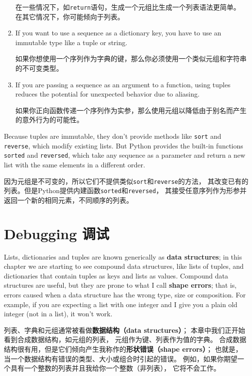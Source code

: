 \documentclass[10pt]{book}
\begin{document}
\begin{CJK}{UTF8}{gbsn}
\begin{enumerate}
在一些情况下，如{\tt return}语句，生成一个元组比生成一个列表语法更简单。
在其它情况下，你可能倾向于列表。

\item If you want to use a sequence as a dictionary key, you
have to use an immutable type like a tuple or string.

如果你想使用一个序列作为字典的键，那么你必须使用一个类似元组和字符串的不可变类型。

\item If you are passing a sequence as an argument to a function,
using tuples reduces the potential for unexpected behavior
due to aliasing.

如果你正向函数传递一个序列作为实参，那么使用元组以降低由于别名而产生的意外行为的可能性。

\end{enumerate}

Because tuples are immutable, they don't provide methods
like {\tt sort} and {\tt reverse}, which modify existing lists.
But Python provides the built-in functions {\tt sorted}
and {\tt reversed}, which take any sequence as a parameter
and return a new list with the same elements in a different
order.

因为元组是不可变的，所以它们不提供类似{\tt sort}和{\tt reverse}的方法，
其改变已有的列表。但是Python提供内建函数{\tt sorted}和{\tt reversed}，
其接受任意序列作为形参并返回一个新的相同元素，不同顺序的列表。


\section{Debugging 调试}

Lists, dictionaries and tuples are known generically as {\bf data
  structures}; in this chapter we are starting to see compound data
structures, like lists of tuples, and dictionaries that contain tuples
as keys and lists as values.  Compound data structures are useful, but
they are prone to what I call {\bf shape errors}; that is, errors
caused when a data structure has the wrong type, size or composition.
For example, if you are expecting a list with one integer and I
give you a plain old integer (not in a list), it won't work.

列表、字典和元组通常被看做{\bf 数据结构（data structures）}；
本章中我们正开始看到合成数据结构，如元组的列表，
元组作为键、列表作为值的字典。
合成数据结构很有用，但是它们倾向产生我称作的{\bf 形状错误（shape errors）}；
也就是，当一个数据结构有错误的类型、大小或组合时引起的错误。
例如，如果你期望一个具有一个整数的列表并且我给你一个整数（非列表），
它将不会工作。


\end{CJK}
\end{document}
